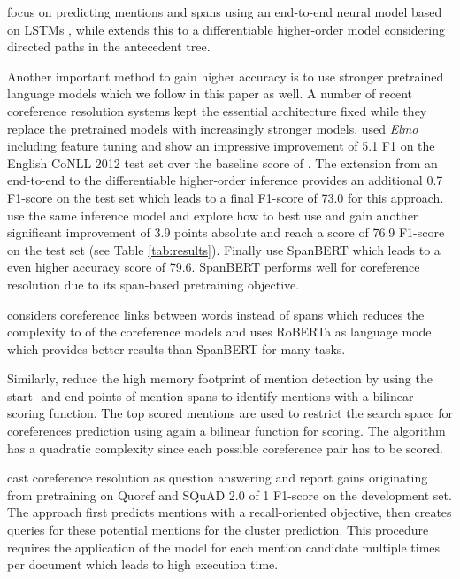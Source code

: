 \documentclass[11pt,a4paper]{article}
\begin{document}
 focus on predicting mentions and spans using an end-to-end neural model based on LSTMs \cite{HochSchm97}, while  extends this to a differentiable higher-order model considering directed paths in the antecedent tree. 

Another important method to gain higher accuracy is to use stronger pretrained language models which we follow in this paper as well. A number of recent coreference resolution systems kept the essential architecture fixed while they replace the pretrained models with increasingly stronger models.  used {\em Elmo} \cite{peters-etal-2018-deep} including feature tuning and show an impressive improvement of 5.1 F1 on the English CoNLL 2012 test set over the baseline score of . The extension from an end-to-end to the differentiable higher-order inference provides an additional 0.7 F1-score on the test set which leads to a final F1-score of 73.0 for this approach.  use the same inference model and explore how to best use and gain another significant improvement of 3.9 points absolute and reach a score of 76.9 F1-score on the test set (see Table \ref{tab:results}). Finally  use SpanBERT which leads to a even higher accuracy score of 79.6. SpanBERT performs well for coreference resolution due to its span-based pretraining objective.

  considers coreference links between words instead of spans which reduces the complexity to  of the coreference models and uses RoBERTa as language model which provides better results than SpanBERT for many tasks.
 
 Similarly,  reduce the high memory footprint of mention detection by using the start- and end-points of mention spans to identify mentions with a bilinear scoring function. The top  scored mentions are used to restrict the search space for coreferences prediction using again a bilinear function for scoring. The algorithm has a quadratic complexity since each possible coreference pair has to be scored. 

 cast coreference resolution as question answering and report gains originating from pretraining on Quoref and SQuAD 2.0 of 1 F1-score on the development set. The approach first predicts mentions with a recall-oriented objective, then creates queries for these potential mentions for the cluster prediction. This procedure requires the application of the model for each mention candidate multiple times per document which leads to high execution time.  
\end{document}

